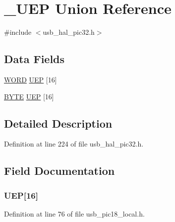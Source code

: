 \hypertarget{union___u_e_p}{}\section{\+\_\+\+U\+E\+P Union Reference}
\label{union___u_e_p}


{\ttfamily \#include $<$usb\+\_\+hal\+\_\+pic32.\+h$>$}

\subsection*{Data Fields}
\begin{DoxyCompactItemize}
\item 
\hyperlink{_generic_type_defs_8h_a2b0e863dadf920709ec53d9088ee7c91}{W\+O\+R\+D} \hyperlink{union___u_e_p_a12c497b0f747f454afa0edcd7d93d0df}{U\+E\+P} \mbox{[}16\mbox{]}
\item 
\hyperlink{_generic_type_defs_8h_a4ae1dab0fb4b072a66584546209e7d58}{B\+Y\+T\+E} \hyperlink{union___u_e_p_a5b4ef48ae328cb65f7b62280a2476d30}{U\+E\+P} \mbox{[}16\mbox{]}
\end{DoxyCompactItemize}


\subsection{Detailed Description}


Definition at line 224 of file usb\+\_\+hal\+\_\+pic32.\+h.



\subsection{Field Documentation}
\hypertarget{union___u_e_p_a5b4ef48ae328cb65f7b62280a2476d30}{}
\subsubsection[{U\+E\+P}]{ U\+E\+P\mbox{[}16\mbox{]}}\label{union___u_e_p_a5b4ef48ae328cb65f7b62280a2476d30}


Definition at line 76 of file usb\+\_\+pic18\+\_\+local.\+h.

\hypertarget{union___u_e_p_a12c497b0f747f454afa0edcd7d93d0df}{}
